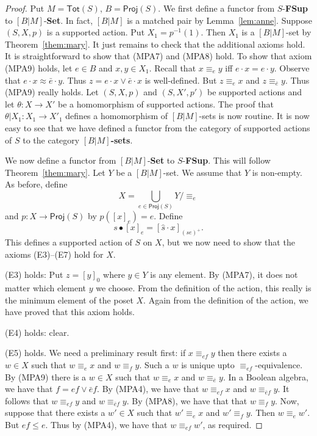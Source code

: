 \documentclass[10pt,a4paper]{amsart}
\begin{document}
\begin{proof} Put $M = \mathsf{Tot}(S)$, $B = \mathsf{Proj}(S)$. 
We first define a functor from $S$-{\bf FSup} to $[B|M]$-{\bf Set}.
In fact, $[B|M]$ is a matched pair by Lemma~\ref{lem:anne}.
Suppose $(S,X,p)$ is a supported action.
Put $X_{1} = p^{-1}(1)$.
Then $X_{1}$ is a $[B|M]$-set by Theorem~\ref{them:mary}.
It just remains to check that the additional axioms hold.
It is straightforward to show that (MPA7) and (MPA8) hold.
To show that axiom (MPA9) holds,
let $e \in B$ and $x,y \in X_{1}$.
Recall that $x \equiv_{e} y$ iff $e \cdot x = e \cdot y$.
Observe that
$e \cdot x \approx \bar{e} \cdot y$.
Thus $z = e \cdot x \vee \bar{e} \cdot x$ is well-defined.
But $z \equiv_{e} x$ and $z \equiv_{\bar{e}} y$.
Thus (MPA9) really holds.
Let $(S,X,p)$ and $(S,X',p')$ be supported actions
and
let $\theta \colon X \rightarrow X'$ be a homomorphism of supported actions.
The proof that $\theta | X_{1} \colon X_{1} \rightarrow X'_{1}$ defines a homomorphism of $[B|M]$-sets
is now routine.
It is now easy to see that we have defined a functor from the category of supported actions of $S$
to the category {\bf $[B|M]$-sets}.

We now define a functor from $[B|M]$-{\bf Set} to  $S$-{\bf FSup}.
This will follow Theorem~\ref{them:mary}.
Let $Y$ be a $[B|M]$-set.
We assume that $Y$ is non-empty.
As before, 
define
$$X = \bigcup_{e \in \mathsf{Proj}(S)} Y/\equiv_{e}$$
and
$p \colon X \rightarrow \mathsf{Proj}(S)$
by $p([x]_{e}) = e$.
Define 
$$s \bullet [x]_{e} = [\hat{s} \cdot x]_{(se)^{+}}.$$
This defines a supported action of $S$ on $X$, but we now need to show that the axioms
(E3)--(E7) hold for $X$.

(E3) holds: 
Put $z = [y]_{0}$ where $y \in Y$ is any element.
By (MPA7), it does not matter which element $y$ we choose.
From the definition of the action, this really is the minimum element of the poset $X$.
Again from the definition of the action, we have proved that this axiom holds.

(E4) holds: clear.

(E5) holds.
We need a preliminary result first:
if $x \equiv_{ef} y$ then there exists a $w \in X$ such that
$w \equiv_{e} x$ and $w \equiv_{f} y$.
Such a $w$ is unique upto $\equiv_{ef}$-equivalence.
By (MPA9)
there is a $w \in X$ such that $w \equiv_{e} x$ and $w \equiv_{\bar{e}} y$.
In a Boolean algebra, we have that $f = ef \vee \bar{e}f$.
By (MPA4),
we have that $w \equiv_{ef} x$ and $w \equiv_{\bar{e}f} y$. 
It follows that $w \equiv_{ef} y$ and $w \equiv_{\bar{e}f} y$.
By (MPA8), we have that that $w \equiv_{f} y$.
Now, suppose that there exists a $w' \in X$ such that
$w' \equiv_{e} x$ and $w' \equiv_{f} y$.
Then $w \equiv_{e} w'$.
But $ef \leq e$.
Thus by (MPA4),
we have that  $w \equiv_{ef} w'$, as required.


\end{proof}
\end{document}
